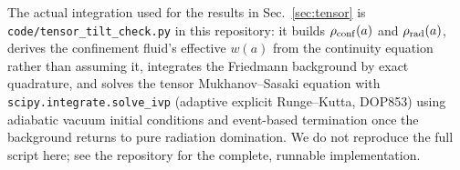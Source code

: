 \documentclass[twocolumn, PRD, amsmath, amssymb, aps, nofootinbib]{revtex4-2}
\begin{document}
The actual integration used for the results in Sec.~\ref{sec:tensor} is \texttt{code/tensor\_tilt\_check.py} in this repository: it builds $\rho_{\rm conf}(a)$ and $\rho_{\rm rad}(a)$, derives the confinement fluid's effective $w(a)$ from the continuity equation rather than assuming it, integrates the Friedmann background by exact quadrature, and solves the tensor Mukhanov--Sasaki equation with \texttt{scipy.integrate.solve\_ivp} (adaptive explicit Runge--Kutta, DOP853) using adiabatic vacuum initial conditions and event-based termination once the background returns to pure radiation domination. We do not reproduce the full script here; see the repository for the complete, runnable implementation.
\end{document}
